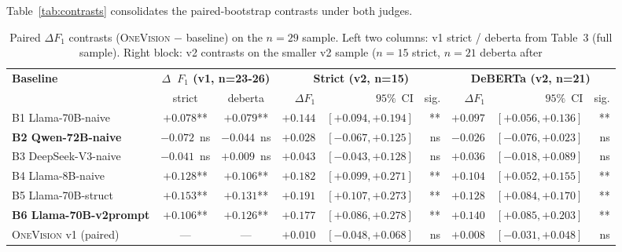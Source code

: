 \documentclass[11pt,a4paper]{article}
\begin{document}
Table~\ref{tab:contrasts} consolidates the paired-bootstrap
contrasts under both judges.

\begin{table}[t]
\centering
\small
\begin{tabular}{l|cc|rrr|rrr}
\toprule
\multirow{2}{*}{\textbf{Baseline}}
  & \multicolumn{2}{c|}{\textbf{$\Delta$~$F_1$ (v1, n=23-26)}}
  & \multicolumn{3}{c|}{\textbf{Strict (v2, n=15)}}
  & \multicolumn{3}{c}{\textbf{DeBERTa (v2, n=21)}}\\
& strict & deberta
  & $\Delta F_1$ & $95\%$~CI & sig.
  & $\Delta F_1$ & $95\%$~CI & sig. \\
\midrule
B1 Llama-70B-naive         & $+0.078$** & $+0.079$**
                            & $+0.144$ & $[+0.094,+0.194]$ & **
                            & $+0.097$ & $[+0.056,+0.136]$ & ** \\
\textbf{B2 Qwen-72B-naive} & $-0.072$~ns & $-0.044$~ns
                            & $\mathbf{+0.028}$ & $[-0.067,+0.125]$ & ns
                            & $-0.026$ & $[-0.076,+0.023]$ & ns \\
B3 DeepSeek-V3-naive       & $-0.041$~ns & $+0.009$~ns
                            & $+0.043$ & $[-0.043,+0.128]$ & ns
                            & $+0.036$ & $[-0.018,+0.089]$ & ns \\
B4 Llama-8B-naive          & $+0.128$** & $+0.106$**
                            & $+0.182$ & $[+0.099,+0.271]$ & **
                            & $+0.104$ & $[+0.052,+0.155]$ & ** \\
B5 Llama-70B-struct        & $+0.153$** & $+0.131$**
                            & $+0.191$ & $[+0.107,+0.273]$ & **
                            & $+0.128$ & $[+0.084,+0.170]$ & ** \\
\textbf{B6 Llama-70B-v2prompt} & $+0.106$** & $+0.126$**
                            & $\mathbf{+0.177}$ & $\mathbf{[+0.086,+0.278]}$ & **
                            & $\mathbf{+0.140}$ & $\mathbf{[+0.085,+0.203]}$ & ** \\
\midrule
\textsc{OneVision} v1 (paired) & --- & ---
                                & $+0.010$ & $[-0.048,+0.068]$ & ns
                                & $+0.008$ & $[-0.031,+0.048]$ & ns \\
\bottomrule
\end{tabular}
\caption{Paired $\Delta F_1$ contrasts (\textsc{OneVision} $-$
baseline) on the $n\!=\!29$ sample. Left two columns: v1 strict /
deberta from Table~3 (full sample). Right block: v2 contrasts on
the smaller v2 sample ($n\!=\!15$ strict, $n\!=\!21$ deberta after
}
\end{table}
\end{document}
